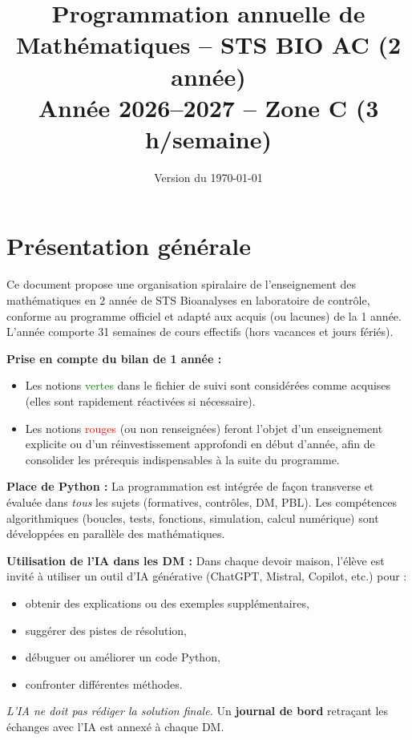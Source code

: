 \documentclass[a4paper,12pt]{article}
\title{Programmation annuelle de Mathématiques -- STS BIO AC (2\up{me} année) \\
       Année 2026--2027 -- Zone C (3 h/semaine)}
\author{}
\date{Version du \today}
\begin{document}
\maketitle

\section*{Présentation générale}
Ce document propose une organisation spiralaire de l’enseignement des mathématiques en 2 année de STS Bioanalyses en laboratoire de contrôle, conforme au programme officiel et adapté aux acquis (ou lacunes) de la 1 année. L’année comporte 31 semaines de cours effectifs (hors vacances et jours fériés).

\medskip
\noindent \textbf{Prise en compte du bilan de 1 année :}
\begin{itemize}
    \item Les notions \textcolor{green}{vertes} dans le fichier de suivi sont considérées comme acquises (elles sont rapidement réactivées si nécessaire).
    \item Les notions \textcolor{red}{rouges} (ou non renseignées) feront l’objet d’un enseignement explicite ou d’un réinvestissement approfondi en début d’année, afin de consolider les prérequis indispensables à la suite du programme.
\end{itemize}

\medskip
\textbf{Place de Python :} La programmation est intégrée de façon transverse et évaluée dans \emph{tous} les sujets (formatives, contrôles, DM, PBL). Les compétences algorithmiques (boucles, tests, fonctions, simulation, calcul numérique) sont développées en parallèle des mathématiques.

\medskip
\textbf{Utilisation de l’IA dans les DM :} Dans chaque devoir maison, l’élève est invité à utiliser un outil d’IA générative (ChatGPT, Mistral, Copilot, etc.) pour :
\begin{itemize}
    \item obtenir des explications ou des exemples supplémentaires,
    \item suggérer des pistes de résolution,
    \item débuguer ou améliorer un code Python,
    \item confronter différentes méthodes.
\end{itemize}
\emph{L’IA ne doit pas rédiger la solution finale.} Un \textbf{journal de bord} retraçant les échanges avec l’IA est annexé à chaque DM.
\end{document}
